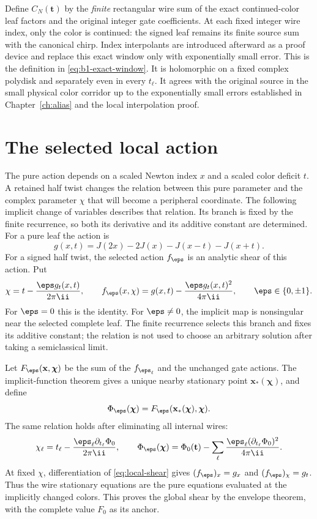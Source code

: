 Define $C_N(\mathbf t)$ by the \emph{finite} rectangular wire sum of the exact continued-color leaf factors and the original integer gate coefficients. At each fixed integer wire index, only the color is continued: the signed leaf remains its finite source sum with the canonical chirp. Index interpolants are introduced afterward as a proof device and replace this exact window only with exponentially small error. This is the definition in \eqref{eq:b1-exact-window}. It is holomorphic on a fixed complex polydisk and separately even in every $t_\ell$. It agrees with the original source in the small physical color corridor up to the exponentially small errors established in Chapter~\ref{ch:alias} and the local interpolation proof.

\section{The selected local action}

The pure action depends on a scaled Newton index $x$ and a scaled color deficit $t$. A retained half twist changes the relation between this pure parameter and the complex parameter $\chi$ that will become a peripheral coordinate. The following implicit change of variables describes that relation. Its branch is fixed by the finite recurrence, so both its derivative and its additive constant are determined.
For a pure leaf the action is
\begin{equation}\label{eq:pure-color-action}
 g(x,t)=J(2x)-2J(x)-J(x-t)-J(x+t).
\end{equation}
For a signed half twist, the selected action $f_\eps$ is an analytic shear of this action. Put
\begin{equation}\label{eq:local-shear}
 \chi=t-\frac{\eps g_t(x,t)}{2\pi\ii},\qquad
 f_\eps(x,\chi)=g(x,t)-\frac{\eps g_t(x,t)^2}{4\pi\ii},
 \qquad \eps\in\{0,\pm1\}.
\end{equation}
For $\eps=0$ this is the identity. For $\eps\ne0$, the implicit map is nonsingular near the selected complete leaf. The finite recurrence selects this branch and fixes its additive constant; the relation is not used to choose an arbitrary solution after taking a semiclassical limit.

Let $F_\eps(\mathbf x,\boldsymbol\chi)$ be the sum of the $f_{\eps_\ell}$ and the unchanged gate actions. The implicit-function theorem gives a unique nearby stationary point $\mathbf x_*(\boldsymbol\chi)$, and define
\[
 \Phi_\eps(\boldsymbol\chi)
 =F_\eps(\mathbf x_*(\boldsymbol\chi),\boldsymbol\chi).
\]
The same relation holds after eliminating all internal wires:
\[
 \chi_\ell=t_\ell-\frac{\eps_\ell\partial_{t_\ell}\Phi_0}{2\pi\ii},\qquad
 \Phi_\eps(\boldsymbol\chi)
 =\Phi_0(\mathbf t)-\sum_\ell
 \frac{\eps_\ell(\partial_{t_\ell}\Phi_0)^2}{4\pi\ii}.
\]
At fixed $\chi$, differentiation of \eqref{eq:local-shear} gives $(f_\eps)_x=g_x$ and $(f_\eps)_\chi=g_t$. Thus the wire stationary equations are the pure equations evaluated at the implicitly changed colors. This proves the global shear by the envelope theorem, with the complete value $F_0$ as its anchor.


